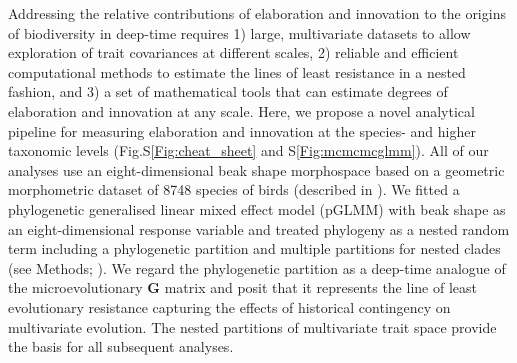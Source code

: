 \documentclass[12pt,letterpaper]{article}
\begin{document}
Addressing the relative contributions of elaboration and innovation to the origins of biodiversity in deep-time requires
1) large, multivariate datasets to allow exploration of trait covariances at different scales,
2) reliable and efficient computational methods to estimate the lines of least resistance in a nested fashion,
and 3) a set of mathematical tools that can estimate degrees of elaboration and innovation at any scale.
Here, we propose a novel analytical pipeline for measuring elaboration and innovation at the species- and higher taxonomic levels (Fig.S\ref{Fig:cheat_sheet} and S\ref{Fig:mcmcmcglmm}).
All of our analyses use an eight-dimensional beak shape morphospace based on a geometric morphometric dataset of 8748 species of birds (described in \cite{hughes2022global}).
We fitted a phylogenetic generalised linear mixed effect model (pGLMM) with beak shape as an eight-dimensional response variable and treated phylogeny as a nested random term including a phylogenetic partition and multiple partitions for nested clades (see Methods; \cite{MCMCglmm}).
We regard the phylogenetic partition as a deep-time analogue of the microevolutionary \textbf{G} matrix and posit that it represents the line of least evolutionary resistance capturing the effects of historical contingency on multivariate evolution.
The nested partitions of multivariate trait space provide the basis for all subsequent analyses.
\end{document}

